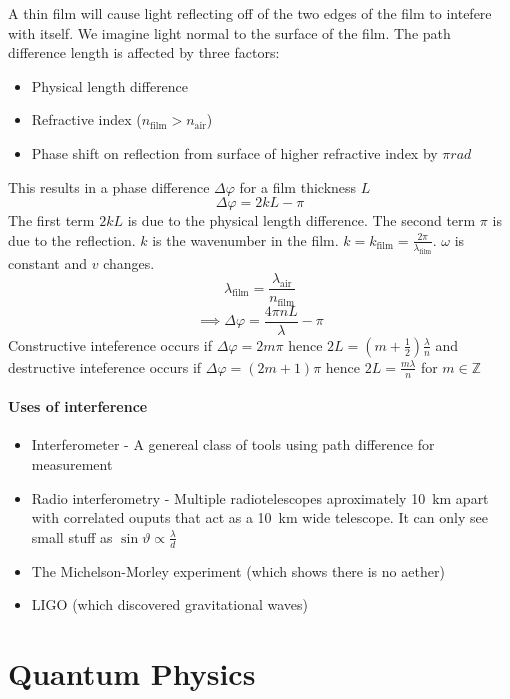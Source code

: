 \documentclass{article}
\newcommand{\bb}[1]{\mathbb{#1}}
\begin{document}
A thin film will cause light reflecting off of the two edges of the film to intefere with itself. We imagine light normal to the surface of the film. The path difference length is affected by three factors:
\begin{itemize}
\item Physical length difference
\item Refractive index (\(n_{\text{film}}>n_{\text{air}}\))
\item Phase shift on reflection from surface of higher refractive index by \(\si{\pi rad}\) 
\end{itemize}
This results in a phase difference \(\Delta\varphi\) for a film thickness \(L\)
\[\Delta\varphi=2kL-\pi\]
The first term \(2kL\) is due to the physical length difference. The second term \(\pi\) is due to the reflection. \(k\) is the wavenumber in the film. \(k = k_{\text{film}}=\frac{2\pi}{\lambda_{\text{film}}}\). \(\omega\) is constant and \(v\) changes.
\[\lambda_{\text{film}}=\frac{\lambda_{\text{air}}}{n_{\text{film}}}\]
\[\implies\Delta\varphi=\frac{4\pi nL}{\lambda}-\pi\]
Constructive inteference occurs if \(\Delta\varphi=2m\pi\) hence \(2L = \left(m+\frac 12\right)\frac{\lambda}{n}\) and destructive inteference occurs if \(\Delta\varphi=(2m+1)\pi\) hence \(2L = \frac{m\lambda}{n}\) for \(m\in\bb Z\)

\subsection*{Uses of interference}

\begin{itemize}
\item Interferometer - A genereal class of tools using path difference for measurement
\item Radio interferometry - Multiple radiotelescopes aproximately \SI{10}{km} apart with correlated ouputs that act as a \SI{10}{km} wide telescope. It can only see small stuff as \(\sin\vartheta\propto\frac{\lambda}{d}\)
\item The Michelson-Morley experiment (which shows there is no aether)
\item LIGO (which discovered gravitational waves)
\end{itemize}

\part{Quantum Physics}
\section{}
\end{document}
